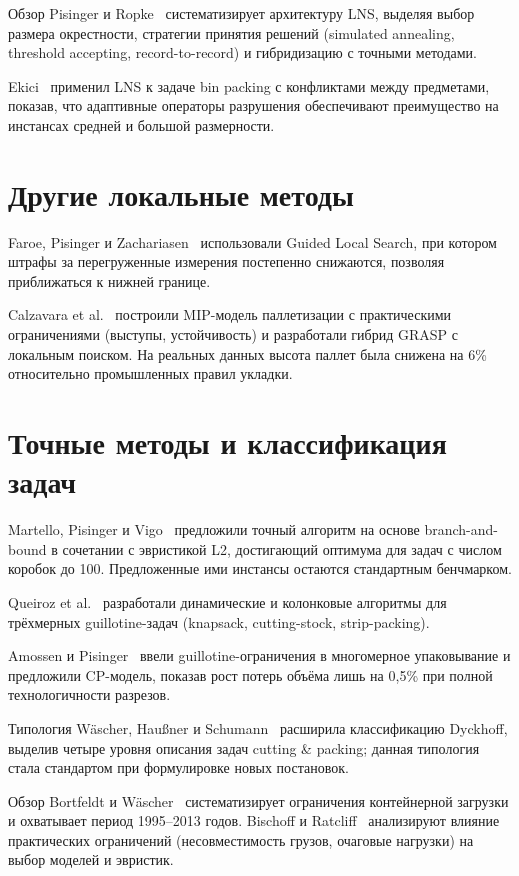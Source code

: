 Обзор Pisinger и Ropke~\cite{Pisinger2010} систематизирует архитектуру LNS, выделяя выбор размера окрестности, стратегии принятия решений (simulated annealing, threshold accepting, record-to-record) и гибридизацию с точными методами.

Ekici~\cite{Ekici2023} применил LNS к задаче bin packing с конфликтами между предметами, показав, что адаптивные операторы разрушения обеспечивают преимущество на инстансах средней и большой размерности.

\section{Другие локальные методы}

Faroe, Pisinger и Zachariasen~\cite{Faroe2003} использовали Guided Local Search, при котором штрафы за перегруженные измерения постепенно снижаются, позволяя приближаться к нижней границе.

Calzavara et al.~\cite{Calzavara2021} построили MIP-модель паллетизации с практическими ограничениями (выступы, устойчивость) и разработали гибрид GRASP с локальным поиском. На реальных данных высота паллет была снижена на 6\% относительно промышленных правил укладки.

\section{Точные методы и классификация задач}

Martello, Pisinger и Vigo~\cite{Martello2000} предложили точный алгоритм на основе branch-and-bound в сочетании с эвристикой L2, достигающий оптимума для задач с числом коробок до 100. Предложенные ими инстансы остаются стандартным бенчмарком.

Queiroz et al.~\cite{Queiroz2012} разработали динамические и колонковые алгоритмы для трёхмерных guillotine-задач (knapsack, cutting-stock, strip-packing).

Amossen и Pisinger~\cite{Amossen2010} ввели guillotine-ограничения в многомерное упаковывание и предложили CP-модель, показав рост потерь объёма лишь на 0,5\% при полной технологичности разрезов.

Типология Wäscher, Haußner и Schumann~\cite{Wascher2007} расширила классификацию Dyckhoff, выделив четыре уровня описания задач cutting \& packing; данная типология стала стандартом при формулировке новых постановок.

Обзор Bortfeldt и Wäscher~\cite{Bortfeldt2013} систематизирует ограничения контейнерной загрузки и охватывает период 1995--2013 годов. Bischoff и Ratcliff~\cite{Bischoff1995} анализируют влияние практических ограничений (несовместимость грузов, очаговые нагрузки) на выбор моделей и эвристик.

